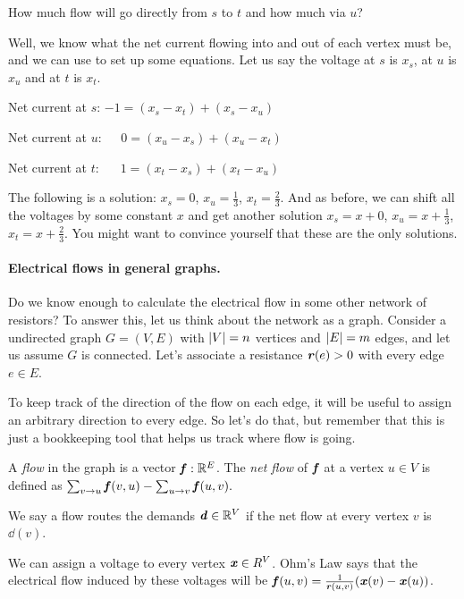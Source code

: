 How much flow will go directly from $s$ to $t$ and how much via $u$?

Well, we know what the net current flowing into and out of each vertex
must be, and we can use to set up some equations.
Let us say the voltage at $s$ is $x_s$, at $u$ is $x_u$ and at $t$ is $x_t$.
\begin{tight_itemize}
\item Net current at $s$:   $-1 = (x_s-x_t) + (x_s-x_u)$
\item  Net current at $u$:   $\phantom{-}0 = (x_u-x_s) + (x_u-x_t)$
\item Net current at  $t$:\,   $\phantom{-}1 = (x_t-x_s)+(x_t-x_u)$
\end{tight_itemize}
The following is a solution: $x_s = 0$, $x_u = \frac{1}{3}$, $x_t
= \frac{2}{3}$.
And as before, we can shift all the voltages by some constant $x$ and
get another solution $x_s = x+0$, $x_u = x+\frac{1}{3}$, $x_t
= x+\frac{2}{3}$. You might want to convince yourself that these are the only solutions.

\paragraph{Electrical flows in general graphs.}
Do we know enough to calculate the electrical flow in some other
network of resistors?
To answer this, let us think about the network
as a graph.
Consider a undirected graph $G = (V,E)$ with $\left|V \right| = n$ vertices and
$\left|E \right| = m$ edges, and let us assume $G$ is connected.
Let's associate a resistance
$\boldsymbol{\mathit{r}}(e) > 0$ with every edge $e \in E$.

To keep track of the direction of the flow on each edge, it will be
useful to assign an arbitrary direction to every edge. So let's do
that, but remember that this is just a bookkeeping tool that helps
us track where flow is going.

A \emph{flow} in the graph is a vector $\boldsymbol{\mathit{f}}: \mathbb{R}^E$.
%
The \emph{net flow} of $\boldsymbol{\mathit{f}}$ at a vertex $u \in V$ is defined as
$\sum_{v \to u} \boldsymbol{\mathit{f}}(v,u) - \sum_{u  \to v} \boldsymbol{\mathit{f}}(u,v).$

We say a flow routes the demands $\boldsymbol{\mathit{d}} \in \mathbb{R}^V$ if the net flow at
every vertex $v$ is $\dd(v)$.

We can assign a voltage to every vertex $\boldsymbol{\mathit{x}} \in R^V$.
Ohm's Law says that the electrical flow induced by these voltages will
be $\boldsymbol{\mathit{f}}(u,v) = \frac{1}{\boldsymbol{\mathit{r}}(u,v)} (\boldsymbol{\mathit{x}}(v) - \boldsymbol{\mathit{x}}(u))$.

